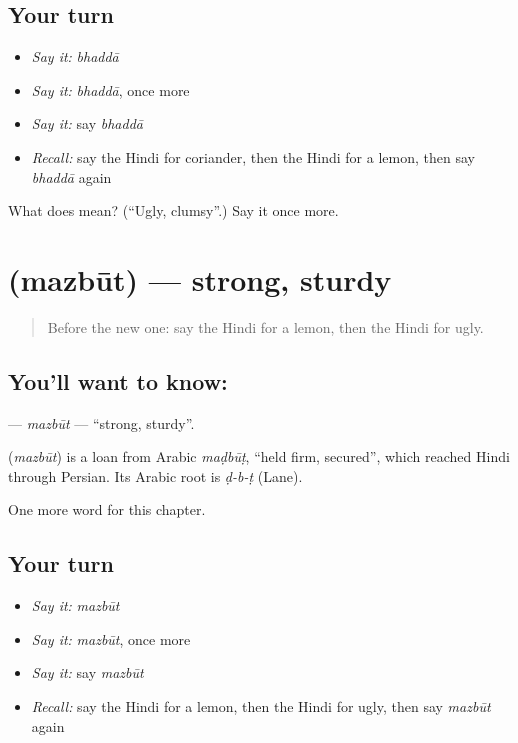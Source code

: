 \subsection*{Your turn}
\begin{itemize}
\raggedright
  \item \emph{Say it:} \emph{bhaddā}
  \item \emph{Say it:} \emph{bhaddā}, once more
  \item \emph{Say it:} say \emph{bhaddā}
  \item \emph{Recall:} say the Hindi for coriander, then the Hindi for a lemon, then say \emph{bhaddā} again
\end{itemize}

\begin{tcolorbox}[breakable,colback=teal!4,colframe=teal!35!black,title={Before you move on}]
What does  mean? (\textquotedblleft{}Ugly, clumsy\textquotedblright{}.) Say it once more.
\end{tcolorbox}
\section[\texorpdfstring{\hi{मज़बूत} (mazbūt)}{मज़बूत (mazbūt)}]{ (mazbūt) — strong, sturdy}

\label{lesson:HI-C212-mazbut}



\begin{quote}
Before the new one: say the Hindi for a lemon, then the Hindi for ugly.
\end{quote}

\subsection*{You'll want to know: }
\textbf{} — \emph{mazbūt} — \textquotedblleft{}strong, sturdy\textquotedblright{}.

\begin{cousinweb}
\textbf{} (\emph{mazbūt}) is a loan from Arabic \emph{maḍbūṭ}, \textquotedblleft{}held firm, secured\textquotedblright{}, which reached Hindi through Persian. Its Arabic root is \emph{ḍ-b-ṭ} (Lane).
\end{cousinweb}

\begin{grammarlens}[title={What you've built}]
One more word for this chapter.
\end{grammarlens}

\subsection*{Your turn}
\begin{itemize}
\raggedright
  \item \emph{Say it:} \emph{mazbūt}
  \item \emph{Say it:} \emph{mazbūt}, once more
  \item \emph{Say it:} say \emph{mazbūt}
  \item \emph{Recall:} say the Hindi for a lemon, then the Hindi for ugly, then say \emph{mazbūt} again
\end{itemize}


